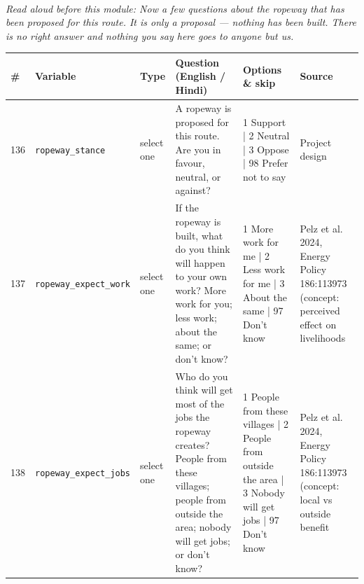 \documentclass[9pt,a4paper,landscape]{article}
\begin{document}
\\[3pt]
{\small\itshape Read aloud before this module: Now a few questions about the ropeway that has been proposed for this route. It is only a proposal — nothing has been built. There is no right answer and nothing you say here goes to anyone but us.}\\[5pt]
\begin{longtable}{@{}p{0.5cm}p{3.3cm}p{1.7cm}p{7.3cm}p{5.6cm}p{5.4cm}@{}}
\toprule \footnotesize\textbf{\#} & \footnotesize\textbf{Variable} & \footnotesize\textbf{Type} & \footnotesize\textbf{Question (English / Hindi)} & \footnotesize\textbf{Options {\&} skip} & \footnotesize\textbf{Source}\\ \midrule
\endhead
\footnotesize 136 & \footnotesize\texttt{ropeway\_stance} & \scriptsize select one & \footnotesize A ropeway is proposed for this route. Are you in favour, neutral, or against?\par\vspace{1pt}{\footnotesize\color{hdr}{\hifont गौरीकुंड से केदारनाथ तक रोपवे बनाने की बात चल रही है। आप इसके पक्ष में हैं, बीच में हैं, या ख़िलाफ़ हैं?}} & \scriptsize 1 Support | 2 Neutral | 3 Oppose | 98 Prefer not to say & \scriptsize Project design\\
\footnotesize 137 & \footnotesize\texttt{ropeway\_expect\_work} & \scriptsize select one & \footnotesize If the ropeway is built, what do you think will happen to your own work? More work for you; less work; about the same; or don't know?\par\vspace{1pt}{\footnotesize\color{hdr}{\hifont अगर रोपवे बन गया, तो आपके अपने काम पर क्या असर होगा? मेरे लिए ज़्यादा काम; मेरे लिए कम काम; लगभग वैसा ही; या पता नहीं?}} & \scriptsize 1 More work for me | 2 Less work for me | 3 About the same | 97 Don't know & \scriptsize Pelz et al. 2024, Energy Policy 186:113973 (concept: perceived effect on livelihoods\\
\footnotesize 138 & \footnotesize\texttt{ropeway\_expect\_jobs} & \scriptsize select one & \footnotesize Who do you think will get most of the jobs the ropeway creates? People from these villages; people from outside the area; nobody will get jobs; or don't know?\par\vspace{1pt}{\footnotesize\color{hdr}{\hifont रोपवे में जो नौकरियाँ बनेंगी, वे ज़्यादातर किसे मिलेंगी? इन गाँवों के लोगों को; इलाके के बाहर के लोगों को; किसी को नहीं मिलेंगी; या पता नहीं?}} & \scriptsize 1 People from these villages | 2 People from outside the area | 3 Nobody will get jobs | 97 Don't know & \scriptsize Pelz et al. 2024, Energy Policy 186:113973 (concept: local vs outside benefit\\

\end{longtable}
\end{document}
